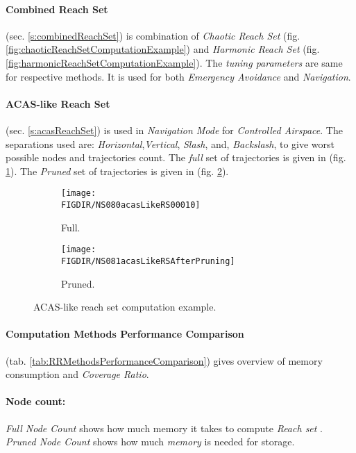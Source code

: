 \paragraph{Combined Reach Set} (sec. \ref{s:combinedReachSet}) is combination of \emph{Chaotic Reach Set} (fig. \ref{fig:chaoticReachSetComputationExample}) and \emph{Harmonic Reach Set} (fig. \ref{fig:harmonicReachSetComputationExample}). The \emph{tuning parameters} are same for respective methods. It is used for both \emph{Emergency Avoidance} and \emph{Navigation}. 

\paragraph{ACAS-like Reach Set} (sec. \ref{s:acasReachSet}) is used in \emph{Navigation Mode} for \emph{Controlled Airspace}. The separations used are: \emph{Horizontal},\emph{Vertical}, \emph{Slash}, and, \emph{Backslash}, to give worst possible nodes and trajectories count. The \emph{full} set of trajectories is given in (fig. \ref{fig:acasLikeComputed}). The \emph{Pruned} set of trajectories is given in (fig. \ref{fig:acasLikePruned}).

\begin{figure}[H]
    \centering
    \begin{subfigure}{0.48\textwidth}
    	\centering
        \texttt{[image: \\FIGDIR/NS080acasLikeRS00010]}
        \caption{Full.}
        \label{fig:acasLikeComputed}
    \end{subfigure}
    \begin{subfigure}{0.48\textwidth}
    	\centering
        \texttt{[image: \\FIGDIR/NS081acasLikeRSAfterPruning]} 
        \caption{Pruned.}
        \label{fig:acasLikePruned}
    \end{subfigure}
    \caption{ACAS-like reach set computation example.}
    \label{fig:acasLikeReachSetComputationExample}
\end{figure}


\paragraph{Computation Methods Performance Comparison} (tab. \ref{tab:RRMethodsPerformanceComparison})  gives overview of memory consumption and \emph{Coverage Ratio}.

\paragraph{Node count:} \emph{Full Node Count} shows how much memory it takes to compute \emph{Reach set} . \emph{Pruned Node Count} shows how much \emph{memory} is needed for storage. 

